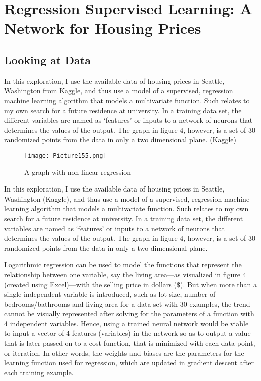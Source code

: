 \documentclass[12pt,a4paper]{article}
\begin{document}
\section{Regression Supervised Learning: A Network for Housing Prices}

\subsection{Looking at Data}


In this exploration, I use the available data of housing prices in Seattle, Washington from Kaggle, and thus use a model of a supervised, regression machine learning algorithm that models a multivariate function. Such relates to my own search for a future residence at university. In a training data set, the different variables are named as ‘features’ or inputs to a network of neurons that determines the values of the output. The graph in figure 4, however, is a set of 30 randomized points from the data in only a two dimensional plane. (Kaggle)

\begin{figure}[h]
    \centering
    \texttt{[image: Picture155.png]}
    \caption{A graph with non-linear regression}
    \label{fig:my_label}
\end{figure}


In this exploration, I use the available data of housing prices in Seattle, Washington (Kaggle), and thus use a model of a supervised, regression machine learning algorithm that models a multivariate function. Such relates to my own search for a future residence at university. In a training data set, the different variables are named as ‘features’ or inputs to a network of neurons that determines the values of the output. The graph in figure 4, however, is a set of 30 randomized points from the data in only a two dimensional plane. 

Logarithmic regression can be used to model the functions that represent the relationship between one variable, say the living area—as visualized in figure 4 (created using Excel)—with the selling price in dollars ($\$$). But when more than a single independent variable is introduced, such as lot size, number of bedrooms/bathrooms and living area for a data set with 30 examples, the trend cannot be visually represented after solving for the parameters of a function with 4 independent variables. Hence, using a trained neural network would be viable to input a vector of 4 features (variables) in the network so as to output a value that is later passed on to a cost function, that is minimized with each data point, or iteration. In other words, the weights and biases are the parameters for the learning function used for regression, which are updated in gradient descent after each training example.
\end{document}
